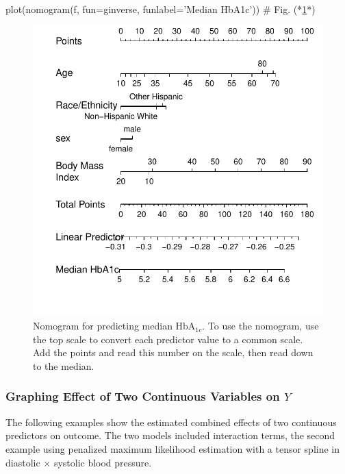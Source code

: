 \begin{Schunk}
\begin{Sinput}
plot(nomogram(f, fun=ginverse, funlabel='Median HbA1c'))  # Fig. (*\ref{fig:descript-rmsc}*)
\end{Sinput}
\begin{figure}[htbp]

\centerline{\includegraphics[width=\maxwidth]{descript-rmsc-1} }

\caption[Nomogram for predicting median HbA$_{1c}$]{Nomogram for predicting median HbA$_{1c}$.  To use the nomogram, use the top  scale to convert each predictor value to a common scale.  Add the points and read this number on the  scale, then read down to the median.}\label{fig:descript-rmsc}
\end{figure}
\end{Schunk}

\subsubsection{Graphing Effect of Two Continuous Variables on $Y$}
The following examples show the estimated combined effects of two
continuous predictors on outcome.  The two models included interaction
terms, the second example using penalized maximum likelihood
estimation with a tensor spline in diastolic $\times$ systolic blood pressure.

